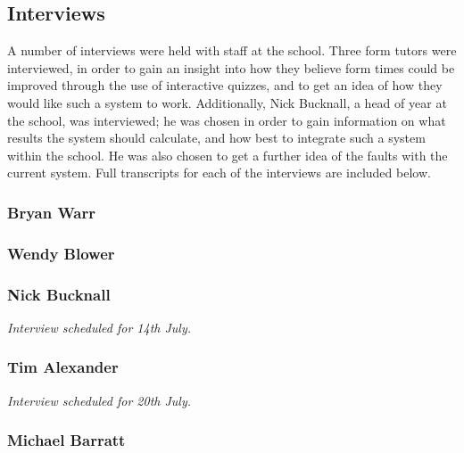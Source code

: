 \subsection{Interviews}

A number of interviews were held with staff at the school. Three form tutors were interviewed, in order to gain an insight into how they believe form times could be improved through the use of interactive quizzes, and to get an idea of how they would like such a system to work. Additionally, Nick Bucknall, a head of year at the school, was interviewed; he was chosen in order to gain information on what results the system should calculate, and how best to integrate such a system within the school. He was also chosen to get a further idea of the faults with the current system. Full transcripts for each of the interviews are included below.

\subsubsection{Bryan Warr}


\subsubsection{Wendy Blower}



\subsubsection{Nick Bucknall}

\textit{Interview scheduled for 14th July.}

\subsubsection{Tim Alexander}

\textit{Interview scheduled for 20th July.}

\subsubsection{Michael Barratt}
